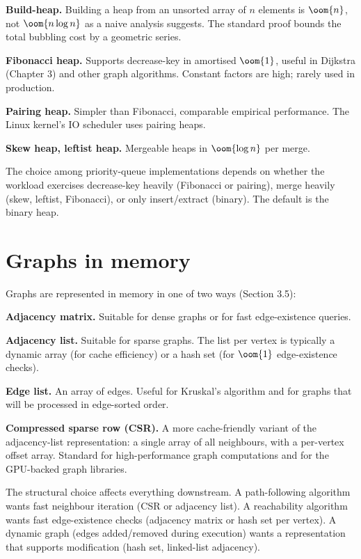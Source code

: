 \textbf{Build-heap.} Building a heap from an unsorted array of $n$ elements is $\oom{n}$, not $\oom{n \log n}$ as a naive analysis suggests. The standard proof bounds the total bubbling cost by a geometric series.

\textbf{Fibonacci heap.} Supports decrease-key in amortised $\oom{1}$, useful in Dijkstra (Chapter 3) and other graph algorithms. Constant factors are high; rarely used in production.

\textbf{Pairing heap.} Simpler than Fibonacci, comparable empirical performance. The Linux kernel's IO scheduler uses pairing heaps.

\textbf{Skew heap, leftist heap.} Mergeable heaps in $\oom{\log n}$ per merge.

The choice among priority-queue implementations depends on whether the workload exercises decrease-key heavily (Fibonacci or pairing), merge heavily (skew, leftist, Fibonacci), or only insert/extract (binary). The default is the binary heap.

\section{Graphs in memory}

Graphs are represented in memory in one of two ways (Section 3.5):

\textbf{Adjacency matrix.} Suitable for dense graphs or for fast edge-existence queries.

\textbf{Adjacency list.} Suitable for sparse graphs. The list per vertex is typically a dynamic array (for cache efficiency) or a hash set (for $\oom{1}$ edge-existence checks).

\textbf{Edge list.} An array of edges. Useful for Kruskal's algorithm and for graphs that will be processed in edge-sorted order.

\textbf{Compressed sparse row (CSR).} A more cache-friendly variant of the adjacency-list representation: a single array of all neighbours, with a per-vertex offset array. Standard for high-performance graph computations and for the GPU-backed graph libraries.

The structural choice affects everything downstream. A path-following algorithm wants fast neighbour iteration (CSR or adjacency list). A reachability algorithm wants fast edge-existence checks (adjacency matrix or hash set per vertex). A dynamic graph (edges added/removed during execution) wants a representation that supports modification (hash set, linked-list adjacency).

